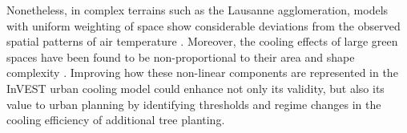 \documentclass[10pt,letterpaper]{article}
\begin{document}
Nonetheless, in complex terrains such as the Lausanne agglomeration, models with uniform weighting of space show considerable deviations from the observed spatial patterns of air temperature \cite{frei2014interpolation,labedens2019modeling}. Moreover, the cooling effects of large green spaces have been found to be non-proportional to their area and shape complexity \cite{chen2014effect,bao2016assessing,du2017quantifying}.
Improving how these non-linear components are represented in the InVEST urban cooling model could enhance not only its validity, but also its value to urban planning by identifying thresholds and regime changes in the cooling efficiency of additional tree planting.


\end{document}
